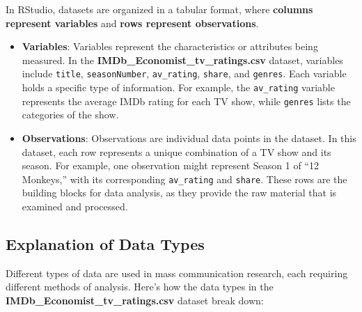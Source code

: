 \documentclass[
]{book}
\begin{document}
In RStudio, datasets are organized in a tabular format, where \textbf{columns represent variables} and \textbf{rows represent observations}.

\begin{itemize}
\item
  \textbf{Variables}: Variables represent the characteristics or attributes being measured. In the \textbf{IMDb\_Economist\_tv\_ratings.csv} dataset, variables include \texttt{title}, \texttt{seasonNumber}, \texttt{av\_rating}, \texttt{share}, and \texttt{genres}. Each variable holds a specific type of information. For example, the \texttt{av\_rating} variable represents the average IMDb rating for each TV show, while \texttt{genres} lists the categories of the show.
\item
  \textbf{Observations}: Observations are individual data points in the dataset. In this dataset, each row represents a unique combination of a TV show and its season. For example, one observation might represent Season 1 of ``12 Monkeys,'' with its corresponding \texttt{av\_rating} and \texttt{share}. These rows are the building blocks for data analysis, as they provide the raw material that is examined and processed.
\end{itemize}

\subsection*{Explanation of Data Types}\label{explanation-of-data-types}

Different types of data are used in mass communication research, each requiring different methods of analysis. Here's how the data types in the \textbf{IMDb\_Economist\_tv\_ratings.csv} dataset break down:
\end{document}
